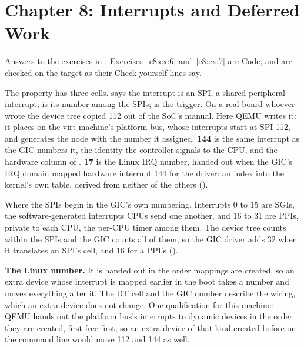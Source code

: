 
\section{Chapter 8: Interrupts and Deferred Work}
\label{sol:sec:c8}
Answers to the exercises in . Exercises~\ref{c8:ex:6} and~\ref{c8:ex:7}
are Code, and are checked on the target as their Check yourself lines say.


 The property has three cells.  says the interrupt is an SPI, a shared peripheral
interrupt;  is its number among the SPIs;  is the trigger. On a real board whoever
wrote the device tree copied 112 out of the SoC's manual. Here QEMU writes it: it places
 on the virt machine's platform bus, whose interrupts start at SPI 112, and generates
the node with the number it assigned. \textbf{144} is the same interrupt as the GIC numbers it, the
identity the controller signals to the CPU, and the hardware column of .
\textbf{17} is the Linux IRQ number, handed out when the GIC's IRQ domain mapped hardware interrupt
144 for the driver: an index into the kernel's own table, derived from neither of the others
().

 Where the SPIs begin in the GIC's own numbering. Interrupts 0 to 15 are SGIs, the
software-generated interrupts CPUs send one another, and 16 to 31 are PPIs, private to each CPU,
the per-CPU timer among them. The device tree counts within the SPIs and the GIC counts all of
them, so the GIC driver adds 32 when it translates an SPI's cell, and 16 for a PPI's
().

 \textbf{The Linux number.} It is handed out in the order mappings are created, so an
extra device whose interrupt is mapped earlier in the boot takes a number and moves everything
after it. The DT cell and the GIC number describe the wiring, which an extra device does not
change. One qualification for this machine: QEMU hands out the platform bus's interrupts to dynamic
devices in the order they are created, first free first, so an extra device of that kind created
before  on the command line would move 112 and 144 as well.

